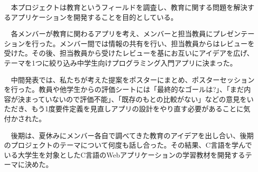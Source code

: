\documentclass[openany,11pt,papersize]{jsbook}
\newcounter{hoge}
\newcommand{\fake}[1]{\whiledo{\thehoge<70}{#1\stepcounter{hoge}}%
  \setcounter{hoge}{0}}
\begin{document}
%
\maketitle

\frontmatter

\begin{jabstract} 
　本プロジェクトは教育というフィールドを調査し、教育に関する問題を解決するアプリケーションを開発することを目的としている。

　各メンバーが教育に関わるアプリを考え、メンバーと担当教員にプレゼンテーションを行った。メンバー間では情報の共有を行い、担当教員からはレビューを受けた。その後、担当教員から受けたレビューを基にお互いにアイデアを広げ、テーマを1つに絞り込み中学生向けプログラミング入門アプリに決まった。%

　中間発表では、私たちが考えた提案をポスターにまとめ、ポスターセッションを行った。教員や他学生からの評価シートには「最終的なゴールは?」、「まだ内容が決まっていないので評価不能」、「既存のもとの比較がない」などの意見をいただき、もう1度要件定義を見直しアプリの設計をやり直す必要があることに気付かされた。

　後期は、夏休みにメンバー各自で調べてきた教育のアイデアを出し合い、後期のプロジェクトのテーマについて何度も話し合った。その結果、C言語を学んでいる大学生を対象としたC言語のWebアプリケーションの学習教材を開発するテーマに決めた。


\end{jabstract}
\end{document}
